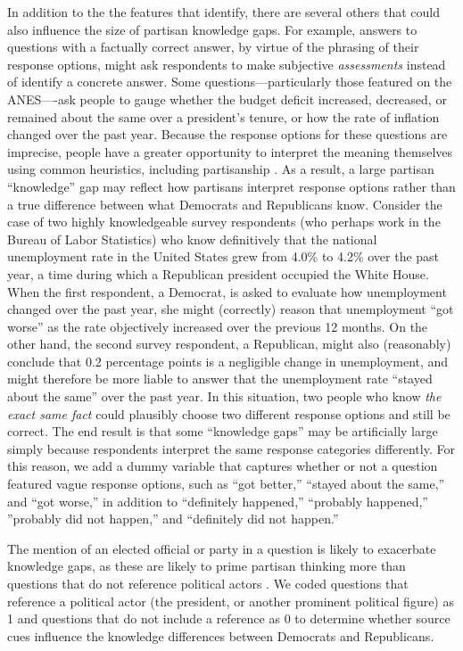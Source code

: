 \documentclass[12pt, letterpaper]{article}
\begin{document}
In addition to the the features that \citet{luskinetal_nd} identify, there are several others that could also influence the size of partisan knowledge gaps. For example, answers to questions with a factually correct answer, by virtue of the phrasing of their response options, might ask respondents to make subjective \textit{assessments} instead of identify a concrete answer. Some questions---particularly those featured on the ANES----ask people to gauge whether the budget deficit increased, decreased, or remained about the same over a president's tenure, or how the rate of inflation changed over the past year. Because the response options for these questions are imprecise, people have a greater opportunity to interpret the meaning themselves \citep[e.g.][]{beyth_1982} using common heuristics, including partisanship \citep[e.g.][]{soodguess_2017}. As a result, a large partisan ``knowledge'' gap may reflect how partisans interpret response options rather than a true difference between what Democrats and Republicans know. Consider the case of two highly knowledgeable survey respondents (who perhaps work in the Bureau of Labor Statistics) who know definitively that the national unemployment rate in the United States grew from 4.0\% to 4.2\% over the past year, a time during which a Republican president occupied the White House. When the first respondent, a Democrat, is asked to evaluate how unemployment changed over the past year, she might (correctly) reason that unemployment ``got worse'' as the rate objectively increased over the previous 12 months. On the other hand, the second survey respondent, a Republican, might also (reasonably) conclude that 0.2 percentage points is a negligible change in unemployment, and might therefore be more liable to answer that the unemployment rate  ``stayed about the same'' over the past year. In this situation, two people who know \textit{the exact same fact} could plausibly choose two different response options and still be correct. The end result is that some ``knowledge gaps'' may be artificially large simply because respondents interpret the same response categories differently. For this reason, we add a dummy variable that captures whether or not a question featured vague response options, such as ``got better,'' ``stayed about the same,'' and ``got worse,'' in addition to ``definitely happened,'' ``probably happened,'' ''probably did not happen,'' and ``definitely did not happen.''

The mention of an elected official or party in a question is likely to exacerbate knowledge gaps, as these are likely to prime partisan thinking more than questions that do not reference political actors \citep[e.g.,][]{bisgaard_slothuus_2018,mondak_1993,Zaller1992}. We coded questions that reference a political actor (the president, or another prominent political figure) as 1 and questions that do not include a reference as 0 to determine whether source cues influence the knowledge differences between Democrats and Republicans.
\end{document}
